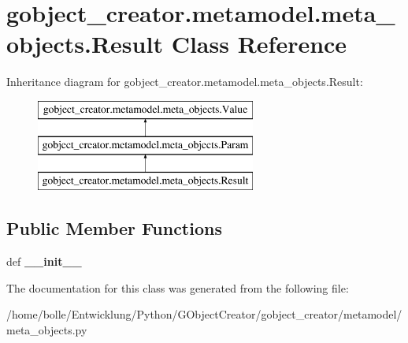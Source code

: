 \hypertarget{classgobject__creator_1_1metamodel_1_1meta__objects_1_1Result}{
\section{gobject\_\-creator.metamodel.meta\_\-objects.Result Class Reference}
\label{classgobject__creator_1_1metamodel_1_1meta__objects_1_1Result}
}
Inheritance diagram for gobject\_\-creator.metamodel.meta\_\-objects.Result:\begin{figure}[H]
\begin{center}
\leavevmode
\includegraphics[height=3cm]{classgobject__creator_1_1metamodel_1_1meta__objects_1_1Result}
\end{center}
\end{figure}
\subsection*{Public Member Functions}
\begin{DoxyCompactItemize}
\item 
\hypertarget{classgobject__creator_1_1metamodel_1_1meta__objects_1_1Result_afe889abeb8de2e1f2aa6e878b938f9ff}{
def {\bfseries \_\-\_\-init\_\-\_\-}}
\label{classgobject__creator_1_1metamodel_1_1meta__objects_1_1Result_afe889abeb8de2e1f2aa6e878b938f9ff}

\end{DoxyCompactItemize}


The documentation for this class was generated from the following file:\begin{DoxyCompactItemize}
\item 
/home/bolle/Entwicklung/Python/GObjectCreator/gobject\_\-creator/metamodel/meta\_\-objects.py\end{DoxyCompactItemize}
